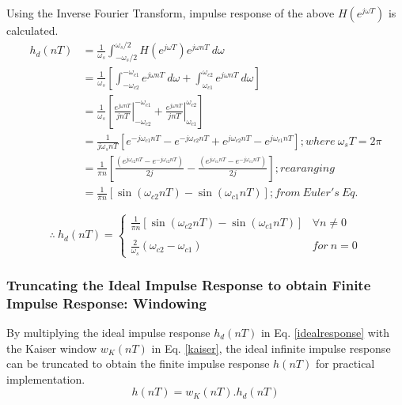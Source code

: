 \documentclass[a4paper,11pt]{article}%
\begin{document}
Using the Inverse Fourier Transform, impulse response of the above $H(e^{j\omega T})$ is calculated.
\[
\begin{split}
	h_d(nT) &=\frac{1}{\omega_s}\int_{-\omega_s/2}^{\omega_s/2} H(e^{j\omega T})e^{j\omega nT}~d\omega\\
	&=\frac{1}{\omega_s}\left[\int_{-\omega_{c2}}^{-\omega_{c1}} e^{j\omega nT} ~d\omega+ \int_{\omega_{c1}}^{\omega_{c2}} e^{j\omega nT}~ d\omega\right]\\
	&=\frac{1}{\omega_s} \left[ \left.\frac{e^{j\omega nT}}{jn T}\right|_{-\omega_{c2}}^{-\omega_{c1}} + \left.\frac{e^{j\omega nT}}{jn T}\right|_{\omega_{c1}}^{\omega_{c2}} \right]\\
	&= \frac{1}{j\omega_s nT} \left[  e^{-j\omega_{c1}nT} - e^{-j\omega_{c2}nT}  +  e^{j\omega_{c2}nT} - e^{j\omega_{c1}nT}  \right] ; where~\omega_sT = 2\pi\\
	&= \frac{1}{\pi n}\left[ \frac{(e^{j\omega_{c2}nT} - e^{-j\omega_{c2}nT})}{2j} - \frac{(e^{j\omega_{c1}nT} - e^{-j\omega_{c1}nT})}{2j}  \right] ; rearanging\\
	&=	\frac{1}{\pi n}\left[   \sin(\omega_{c2}nT) - \sin(\omega_{c1}nT)  \right]; from~ Euler's ~Eq.
\end{split}
\]

\begin{equation}
	\therefore ~ h_d(nT) = \begin{cases}
		\frac{1}{\pi n}\left[   \sin(\omega_{c2}nT) - \sin(\omega_{c1}nT)  \right] & \forall n \ne 0\\
		&\\
		\frac{2}{\omega_s}\left( \omega_{c2} - \omega_{c1}\right)& for~ n = 0
	\end{cases}
\label{idealresponse}
\end{equation}


\subsubsection{Truncating the Ideal Impulse Response to obtain Finite Impulse Response: Windowing}

By multiplying the ideal impulse response $h_d(nT)$ in Eq. \eqref{idealresponse} with the Kaiser window $w_K(nT)$ in Eq. \eqref{kaiser}, the ideal infinite impulse response can be truncated to obtain the finite impulse response $h(nT)$ for practical implementation.
\begin{equation}
h(nT) = 	w_K(nT).h_d(nT)
\end{equation}
\end{document}
